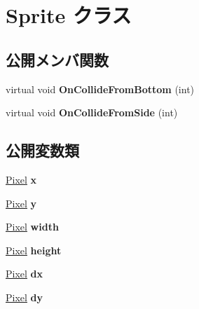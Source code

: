 \hypertarget{class_sprite}{}\section{Sprite クラス}
\label{class_sprite}
\subsection*{公開メンバ関数}
\begin{DoxyCompactItemize}
\item 
virtual void {\bfseries On\+Collide\+From\+Bottom} (int)\hypertarget{class_sprite_a731a5346075de835026e510f0ef407c8}{}\label{class_sprite_a731a5346075de835026e510f0ef407c8}

\item 
virtual void {\bfseries On\+Collide\+From\+Side} (int)\hypertarget{class_sprite_a55e40e7229d039c06cf896226bbee060}{}\label{class_sprite_a55e40e7229d039c06cf896226bbee060}

\end{DoxyCompactItemize}
\subsection*{公開変数類}
\begin{DoxyCompactItemize}
\item 
\hyperlink{_shape_8h_a1532964af24b39019c627e9bcdc22d14}{Pixel} {\bfseries x}\hypertarget{class_sprite_a129842c7186cc8a8a5c6ab5a3d453660}{}\label{class_sprite_a129842c7186cc8a8a5c6ab5a3d453660}

\item 
\hyperlink{_shape_8h_a1532964af24b39019c627e9bcdc22d14}{Pixel} {\bfseries y}\hypertarget{class_sprite_a6a8a1e37c6899973b431ddc64edba4d0}{}\label{class_sprite_a6a8a1e37c6899973b431ddc64edba4d0}

\item 
\hyperlink{_shape_8h_a1532964af24b39019c627e9bcdc22d14}{Pixel} {\bfseries width}\hypertarget{class_sprite_a716a793c2956f450c3276797d4c994cb}{}\label{class_sprite_a716a793c2956f450c3276797d4c994cb}

\item 
\hyperlink{_shape_8h_a1532964af24b39019c627e9bcdc22d14}{Pixel} {\bfseries height}\hypertarget{class_sprite_a668d40c11d3c7f810d763336bbfae3c1}{}\label{class_sprite_a668d40c11d3c7f810d763336bbfae3c1}

\item 
\hyperlink{_shape_8h_a1532964af24b39019c627e9bcdc22d14}{Pixel} {\bfseries dx}\hypertarget{class_sprite_afb0976dc4cf417863058507c4020ee44}{}\label{class_sprite_afb0976dc4cf417863058507c4020ee44}

\item 
\hyperlink{_shape_8h_a1532964af24b39019c627e9bcdc22d14}{Pixel} {\bfseries dy}\hypertarget{class_sprite_aa2e63476af9c7d810532f92f6d6cf1f2}{}\label{class_sprite_aa2e63476af9c7d810532f92f6d6cf1f2}

\end{DoxyCompactItemize}
